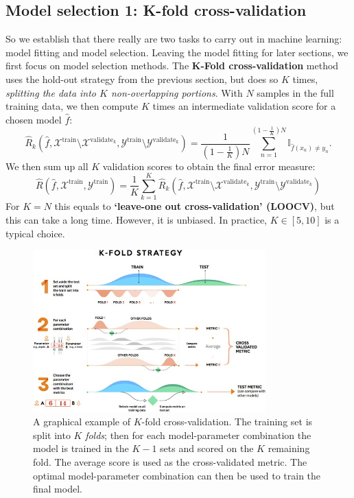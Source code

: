 \documentclass{article}
\begin{document}
\subsection{Model selection 1: K-fold cross-validation}
So we establish that there really are two tasks to carry out in machine learning: model fitting and model selection. Leaving the model fitting for later sections, we first focus on model selection methods. The \textbf{K-Fold cross-validation} method uses the hold-out strategy from the previous section, but does so $K$ times, \textit{splitting the data into $K$ non-overlapping portions}. With $N$ samples in the full training data, we then compute $K$ times an intermediate validation score for a chosen model $\hat{f}$:
\begin{equation}
    \hat{R}_k(\hat{f},\mathcal{X}^\text{train}\setminus\mathcal{X}^\text{validate$_k$},\mathcal{Y}^\text{train}\setminus\mathcal{Y}^\text{validate$_k$}) = \frac{1}{(1-\frac{1}{K})N}\sum_{n=1}^{(1-\frac{1}{K})N} \mathbb{I}_{\hat{f}(x_n)\neq y_n}.
\end{equation}
We then sum up all $K$ validation scores to obtain the final error measure:
\begin{equation}
    \hat{R}(\hat{f},\mathcal{X}^\text{train},\mathcal{Y}^\text{train}) = \frac{1}{K}\sum_{k=1}^K \hat{R}_k(\hat{f},\mathcal{X}^\text{train}\setminus\mathcal{X}^\text{validate$_k$},\mathcal{Y}^\text{train}\setminus\mathcal{Y}^\text{validate$_k$})
\end{equation}
For $K=N$ this equals to \textbf{`leave-one out cross-validation' (LOOCV)}, but this can take a long time. However, it is unbiased. In practice, $K\in[5,10]$ is a typical choice.

\begin{figure}[!h]
    \centering
    \includegraphics[width=0.8\textwidth]{kfold-strategy.jpg}
    \caption{A graphical example of $K$-fold cross-validation. The training set is split into $K$ \textit{folds}; then for each model-parameter combination the model is trained in the $K-1$ sets and scored on the $K$ remaining fold. The average score is used as the cross-validated metric. The optimal model-parameter combination can then be used to train the final model.}
    \label{fig:my_label}
\end{figure}
\end{document}
